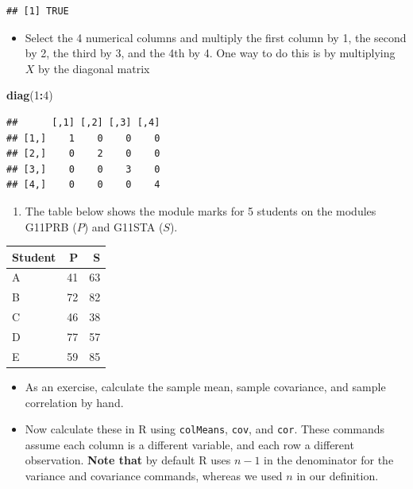 \documentclass[
]{book}
\newenvironment{Shaded}{\begin{snugshade}}{\end{snugshade}}
\newcommand{\DecValTok}[1]{\textcolor[rgb]{0.00,0.00,0.81}{#1}}
\newcommand{\FunctionTok}[1]{\textcolor[rgb]{0.13,0.29,0.53}{\textbf{#1}}}
\newcommand{\NormalTok}[1]{#1}
\newcommand{\SpecialCharTok}[1]{\textcolor[rgb]{0.81,0.36,0.00}{\textbf{#1}}}
\providecommand{\tightlist}{%
  \setlength{\itemsep}{0pt}\setlength{\parskip}{0pt}}
\theoremstyle{definition}
\theoremstyle{definition}
\theoremstyle{definition}
\theoremstyle{definition}
\theoremstyle{remark}
\begin{document}
\begin{verbatim}
## [1] TRUE
\end{verbatim}

\begin{itemize}
\tightlist
\item
  Select the 4 numerical columns and multiply the first column by 1, the second by 2, the third by 3, and the 4th by 4. One way to do this is by multiplying \(X\) by the diagonal matrix
\end{itemize}

\begin{Shaded}
\begin{Highlighting}[]
\FunctionTok{diag}\NormalTok{(}\DecValTok{1}\SpecialCharTok{:}\DecValTok{4}\NormalTok{)}
\end{Highlighting}
\end{Shaded}

\begin{verbatim}
##      [,1] [,2] [,3] [,4]
## [1,]    1    0    0    0
## [2,]    0    2    0    0
## [3,]    0    0    3    0
## [4,]    0    0    0    4
\end{verbatim}

\begin{enumerate}
\def\labelenumi{\arabic{enumi}.}
\setcounter{enumi}{1}
\tightlist
\item
  The table below shows the module marks for 5 students on the modules G11PRB (\(P\)) and G11STA (\(S\)).
\end{enumerate}

\begin{table}
\centering
\begin{tabular}{lrr}
\toprule
Student & P & S\\
\midrule
A & 41 & 63\\
B & 72 & 82\\
C & 46 & 38\\
D & 77 & 57\\
E & 59 & 85\\
\bottomrule
\end{tabular}
\end{table}

\begin{itemize}
\tightlist
\item
  As an exercise, calculate the sample mean, sample covariance, and sample correlation by hand.
\end{itemize}

\begin{itemize}
\tightlist
\item
  Now calculate these in R using \texttt{colMeans}, \texttt{cov}, and \texttt{cor}. These commands assume each column is a different variable, and each row a different observation.
  \textbf{Note that} by default R uses \(n-1\) in the denominator for the variance and covariance commands, whereas we used \(n\) in our definition.
\end{itemize}
\end{document}
